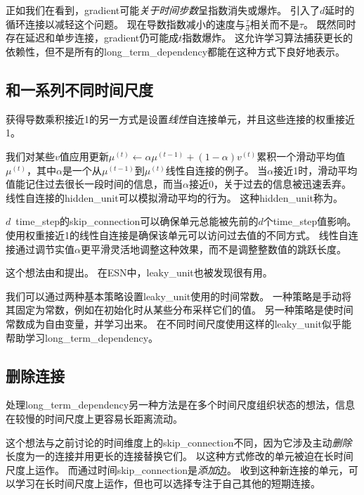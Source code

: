 正如我们在看到，\gls{gradient}可能\emph{关于时间步数}呈指数消失或爆炸。
\citep{Lin-ieeetnn96}引入了$d$延时的循环连接以减轻这个问题。
现在导数指数减小的速度与$\frac{\tau}{d}$相关而不是$\tau$。
既然同时存在延迟和单步连接，\gls{gradient}仍可能成$t$指数爆炸。
这允许学习算法捕获更长的依赖性，但不是所有的\gls{long_term_dependency}都能在这种方式下良好地表示。


\subsection{和一系列不同时间尺度}
\label{sec:leaky_units_and_a_spectrum_of_different_time_scales}
获得导数乘积接近1的另一方式是设置\emph{线性}自连接单元，并且这些连接的权重接近1。

我们对某些$v$值应用更新$\mu^{(t)} \gets \alpha \mu^{(t-1)} + (1-\alpha) v^{(t)}$累积一个滑动平均值$\mu^{(t)}$，其中$\alpha$是一个从$ \mu^{(t-1)}$到$ \mu^{(t)}$线性自连接的例子。
当$\alpha$接近1时，滑动平均值能记住过去很长一段时间的信息，而当$\alpha$接近0，关于过去的信息被迅速丢弃。
线性自连接的\gls{hidden_unit}可以模拟滑动平均的行为。
这种\gls{hidden_unit}称为。

$d$~\gls{time_step}的\gls{skip_connection}可以确保单元总能被先前的$d$个\gls{time_step}值影响。
使用权重接近1的线性自连接是确保该单元可以访问过去值的不同方式。
线性自连接通过调节实值$\alpha$更平滑灵活地调整这种效果，而不是调整整数值的跳跃长度。

这个想法由\cite{Mozer-nips92}和\cite{ElHihi+Bengio-nips8}提出。
在\gls{ESN}中，\gls{leaky_unit}也被发现很有用\citep{JaegerLPS07}。

我们可以通过两种基本策略设置\gls{leaky_unit}使用的时间常数。
一种策略是手动将其固定为常数，例如在初始化时从某些分布采样它们的值。
另一种策略是使时间常数成为自由变量，并学习出来。
在不同时间尺度使用这样的\gls{leaky_unit}似乎能帮助学习\gls{long_term_dependency}\citep{Mozer-nips92,Pascanu+al-ICML2013-small}。

\subsection{删除连接}
\label{sec:removing_connections}
处理\gls{long_term_dependency}另一种方法是在多个时间尺度组织状态的想法\citep{ElHihi+Bengio-nips8}，信息在较慢的时间尺度上更容易长距离流动。

这个想法与之前讨论的时间维度上的\gls{skip_connection}不同，因为它涉及主动\emph{删除}长度为一的连接并用更长的连接替换它们。
以这种方式修改的单元被迫在长时间尺度上运作。
而通过时间\gls{skip_connection}是\emph{添加}边。
收到这种新连接的单元，可以学习在长时间尺度上运作，但也可以选择专注于自己其他的短期连接。

